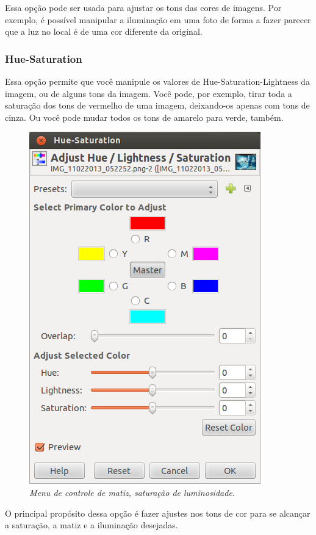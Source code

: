 \documentclass[12pt,onecolumn]{article}
\begin{document}
        Essa opção pode ser usada para ajustar os tons das cores de imagens. Por
        exemplo, é possível manipular a iluminação em uma foto de forma a fazer
        parecer que a luz no local é de uma cor diferente da original.
      
      \subsubsection{Hue-Saturation}
        Essa opção permite que você manipule os valores de
        Hue-Saturation-Lightness da imagem, ou de alguns tons da imagem. Você
        pode, por exemplo, tirar toda a saturação dos tons de vermelho de uma
        imagem, deixando-os apenas com tons de cinza. Ou você pode mudar todos
        os tons de amarelo para verde, também.
        
        \begin{figure}[H]
          \centering
          \includegraphics[width=.6\linewidth]{screenshots/09-hue_saturation.png}
          \caption{
            \footnotesize
            \it
            Menu de controle de matiz, saturação de luminosidade.
          }
          \label{fig:hue_saturation}
        \end{figure}
        
        O principal propósito dessa opção é fazer ajustes nos tons de cor para
        se alcançar a saturação, a matiz e a iluminação desejadas.
      
\end{document}
